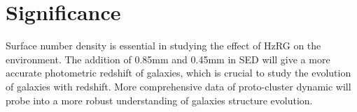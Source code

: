 \documentclass{article}
\begin{document}
\section{Significance}
Surface number density is essential in studying the effect of HzRG on the environment. The addition of 0.85mm and 0.45mm in SED will give a more accurate photometric redshift of galaxies, which is crucial to study the evolution of galaxies with redshift. More comprehensive data of proto-cluster dynamic will probe into a more robust understanding of galaxies structure evolution.



\end{document}
